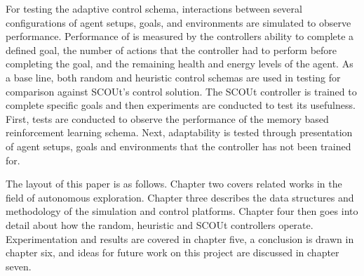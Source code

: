 For testing the adaptive control schema, interactions between several configurations of agent setups, goals, and environments are simulated to observe performance.
Performance of is measured by the controllers ability to complete a defined goal, the number of actions that the controller had to perform before completing the goal, and the remaining health and energy levels of the agent.
As a base line, both random and heuristic control schemas are used in testing for comparison against SCOUt's control solution.
The SCOUt controller is trained to complete specific goals and then experiments are conducted to test its usefulness.
First, tests are conducted to observe the performance of the memory based reinforcement learning schema.
Next, adaptability is tested through presentation of agent setups, goals and environments that the controller has not been trained for.

The layout of this paper is as follows.
Chapter two covers related works in the field of autonomous exploration.
Chapter three describes the data structures and methodology of the simulation and control platforms.
Chapter four then goes into detail about how the random, heuristic and SCOUt controllers operate.
Experimentation and results are covered in chapter five, a conclusion is drawn in chapter six, and ideas for future work on this project are discussed in chapter seven.
